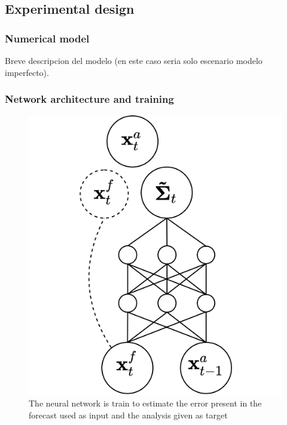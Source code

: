 \documentclass[num-refs]{wiley-article}
\begin{document}







\subsection{Experimental design}

\subsubsection{Numerical model}

Breve descripcion del modelo (en este caso seria solo escenario modelo imperfecto).

\subsubsection{Network architecture and training}


\begin{figure}[hbt!]
\centering
        \includegraphics[width=.25\textwidth]{images/trainNET.png}
        \caption{The neural network is train to estimate the error present in the forecast used as input and the analysis given as target}
\label{FIG:TRAINNET}
\end{figure}
\end{document}
